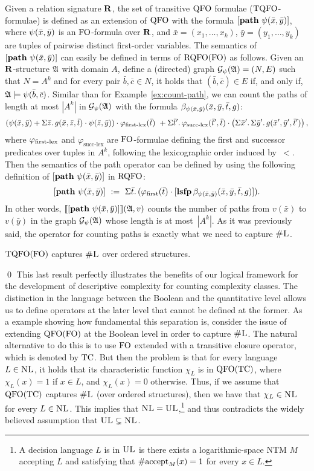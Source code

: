 Given a relation signature $\mathbf{R}$, the set of transitive ${\rm QFO}$ formulae (${\rm TQFO}$-formulae) is defined as an extension of ${\rm QFO}$ with the formula $[{\bf path} \,\, \psi(\bar{x},\bar{y})]$, where $\psi(\bar{x}, \bar{y})$ is an ${\rm FO}$-formula over $\mathbf{R}$, and $\bar{x} = (x_1, \ldots, x_k)$, $\bar{y} = (y_1, \ldots, y_k)$ are tuples of pairwise distinct first-order variables. The semantics of $[{\bf path} \,\, \psi(\bar{x},\bar{y})]$ can easily be defined in terms of ${\rm RQFO}({\rm FO})$ as follows. 
Given an $\mathbf{R}$-structure $\mathfrak{A}$ with domain $A$, define a (directed) graph $\mathcal{G}_{\psi}(\mathfrak{A}) = (N,E)$ such that $N = A^k$ and for every pair $\bar b, \bar c \in N$, it holds that $(\bar b, \bar c) \in E$ if, and only if, $\mathfrak{A} \models \psi(\bar b, \bar c)$.
Similar than for Example~\ref{ex:count-path}, we can count the paths of length at most $|A^k|$ in $ \mathcal{G}_{\psi}(\mathfrak{A})$ with the formula $\beta_{\psi(\bar{x},\bar{y})}(\bar{x}, \bar{y}, \bar{t}, g)$:
\begin{align*}
(\psi(\bar{x},\bar{y}) + \Sigma{\bar{z}}.\, g(\bar{x},\bar{z},\bar{t})\cdot \psi(\bar{z},\bar{y})) \cdot \varphi_{\text{\rm first-lex}}(\bar{t}) \ +
\Sigma{\bar{t}'}.\, \varphi_{\text{succ-lex}}(\bar{t}',\bar{t}) \cdot \left(\Sigma{\bar{x}'}.\, \Sigma{\bar{y}'}.\, g(\bar{x}',\bar{y}',\bar{t}') \right),
\end{align*}
where $\varphi_{\text{\rm first-lex}}$ and $\varphi_{\text{succ-lex}}$ are ${\rm FO}$-formulae defining the first and successor predicates over tuples in $A^k$, following the lexicographic order induced by~$<$.
Then the semantics of the path operator can be defined by using the following definition of $[{\bf path} \,\, \psi(\bar{x},\bar{y})]$ in ${\rm RQFO}$:
\[
[{\bf path} \,\, \psi(\bar{x}, \bar{y})] \ :=\ \Sigma{\bar{t}}.\, (\varphi_{\text{\rm first}}(\bar{t}) \cdot [{\bf lsfp} \, \beta_{\psi(\bar{x},\bar{y})}(\bar{x},\bar{y},\bar{t},g)]).
\]
In other words, ${\llbracket{}{[{\bf path} \,\, \psi(\bar{x}, \bar{y})]}\rrbracket}(\mathfrak{A},v)$ counts the number of paths from $v(\bar x)$ to $v(\bar y)$ in the graph $\mathcal{G}_{\psi}(\mathfrak{A})$ whose length is at most~$|A^k|$.
As it was previously said, the operator for counting paths is exactly what we need to capture $\text{\sc \#L}$.
\begin{thm} \label{tqfo-shl}
	${\rm TQFO}({\rm FO})$ captures $\text{\sc \#L}$ over ordered structures.
\end{thm}
\proof

\qed
This last result perfectly illustrates the benefits of our logical framework for the development of descriptive complexity for counting complexity classes.  
The distinction in the language between the Boolean and the quantitative level allows us to define operators at the later level that cannot be defined at the former. 
As a example showing how fundamental this separation is, consider the issue of extending ${\rm QFO}({\rm FO})$ at the Boolean level in order to capture $\text{\sc \#L}$. The natural alternative to do this is to use ${\rm FO}$ extended with a transitive closure operator, which is denoted by ${\rm TC}$. But then the problem is that for every language $L \in \text{\sc NL}$, it holds that its characteristic function $\chi_L$ is in ${\rm QFO}({\rm TC})$, where $\chi_L(x) = 1$ if $x \in L$, and $\chi_L(x) = 0$ otherwise. Thus, if we assume that ${\rm QFO}({\rm TC})$ captures $\text{\sc \#L}$ (over ordered structures), then we have that $\chi_L \in \text{\sc NL}$ for every $L \in \text{\sc NL}$. This implies that $\text{\sc NL} = \text{\sc UL}$,\footnote{A decision language $L$ is in $\text{\sc UL}$ is there exists a logarithmic-space NTM $M$ accepting $L$ and satisfying that $\text{\rm \#accept}_M(x) = 1$ for every $x \in L$.} 
and thus contradicts the widely believed assumption that $\text{\sc UL} \subsetneq \text{\sc NL}$.